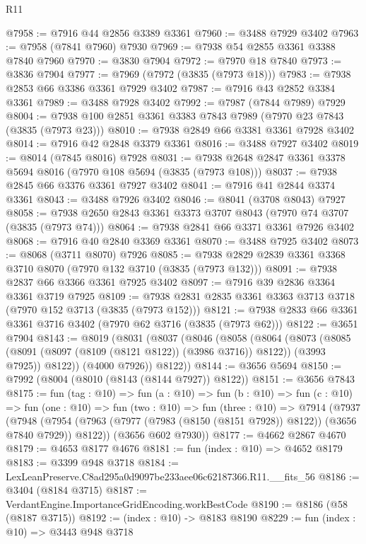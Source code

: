 \begin{lexlean}{R11}
\begin{coremodule}
@7958 := @7916 @44 @2856 @3389 @3361
@7960 := @3488 @7929 @3402
@7963 := @7958 (@7841 @7960) @7930
@7969 := @7938 @54 @2855 @3361 @3388 @7840 @7960
@7970 := @3830 @7904
@7972 := @7970 @18 @7840
@7973 := @3836 @7904
@7977 := @7969 (@7972 (@3835 (@7973 @18)))
@7983 := @7938 @2853 @66 @3386 @3361 @7929 @3402
@7987 := @7916 @43 @2852 @3384 @3361
@7989 := @3488 @7928 @3402
@7992 := @7987 (@7844 @7989) @7929
@8004 := @7938 @100 @2851 @3361 @3383 @7843 @7989 (@7970 @23 @7843 (@3835 (@7973 @23)))
@8010 := @7938 @2849 @66 @3381 @3361 @7928 @3402
@8014 := @7916 @42 @2848 @3379 @3361
@8016 := @3488 @7927 @3402
@8019 := @8014 (@7845 @8016) @7928
@8031 := @7938 @2648 @2847 @3361 @3378 @5694 @8016 (@7970 @108 @5694 (@3835 (@7973 @108)))
@8037 := @7938 @2845 @66 @3376 @3361 @7927 @3402
@8041 := @7916 @41 @2844 @3374 @3361
@8043 := @3488 @7926 @3402
@8046 := @8041 (@3708 @8043) @7927
@8058 := @7938 @2650 @2843 @3361 @3373 @3707 @8043 (@7970 @74 @3707 (@3835 (@7973 @74)))
@8064 := @7938 @2841 @66 @3371 @3361 @7926 @3402
@8068 := @7916 @40 @2840 @3369 @3361
@8070 := @3488 @7925 @3402
@8073 := @8068 (@3711 @8070) @7926
@8085 := @7938 @2829 @2839 @3361 @3368 @3710 @8070 (@7970 @132 @3710 (@3835 (@7973 @132)))
@8091 := @7938 @2837 @66 @3366 @3361 @7925 @3402
@8097 := @7916 @39 @2836 @3364 @3361 @3719 @7925
@8109 := @7938 @2831 @2835 @3361 @3363 @3713 @3718 (@7970 @152 @3713 (@3835 (@7973 @152)))
@8121 := @7938 @2833 @66 @3361 @3361 @3716 @3402 (@7970 @62 @3716 (@3835 (@7973 @62)))
@8122 := @3651 @7904
@8143 := @8019
    (@8031
      (@8037
        (@8046
          (@8058
            (@8064
              (@8073
                (@8085 (@8091 (@8097 (@8109 (@8121 @8122)) (@3986 @3716)) @8122))
                (@3993 @7925))
              @8122))
          (@4000 @7926))
        @8122))
@8144 := @3656 @5694
@8150 := @7992 (@8004 (@8010 (@8143 (@8144 @7927)) @8122))
@8151 := @3656 @7843
@8175 := fun (tag : @10) =>
  fun (a : @10) =>
  fun (b : @10) =>
  fun (c : @10) =>
  fun (one : @10) =>
  fun (two : @10) =>
  fun (three : @10) =>
  @7914
    (@7937
      (@7948 (@7954 (@7963 (@7977 (@7983 (@8150 (@8151 @7928)) @8122)) (@3656 @7840 @7929)) @8122))
      (@3656 @602 @7930))
@8177 := @4662 @2867 @4670
@8179 := @4653 @8177 @4676
@8181 := fun (index : @10) => @4652 @8179
@8183 := @3399 @948 @3718
@8184 := LexLeanPreserve.C8ad295a0d9097be233aee06c62187366.R11.__fits_56
@8186 := @3404 (@8184 @3715)
@8187 := VerdantEngine.ImportanceGridEncoding.workBestCode
@8190 := @8186 (@58 (@8187 @3715))
@8192 := (index : @10) -> @8183 @8190
@8229 := fun (index : @10) =>
  @3443
    @948
    @3718

\end{coremodule}
\end{lexlean}
